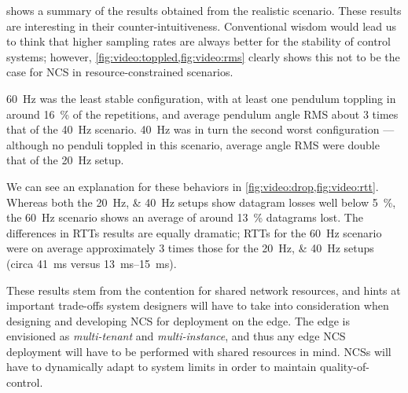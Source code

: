  shows a summary of the results obtained from the realistic scenario.
These results are interesting in their counter-intuitiveness.
Conventional wisdom would lead us to think that higher sampling rates are always better for the stability of control systems; however, \cref{fig:video:toppled,fig:video:rms} clearly shows this not to be the case for \ac{NCS} in resource-constrained scenarios.

\SI{60}{\hertz} was the least stable configuration, with at least one pendulum toppling in around \SI{16}{\percent} of the repetitions, and average pendulum angle \ac{RMS} about \num{3} times that of the \SI{40}{\hertz} scenario.
\SI{40}{\hertz} was in turn the second worst configuration --- although no penduli toppled in this scenario, average angle \ac{RMS} were double that of the \SI{20}{\hertz} setup.

We can see an explanation for these behaviors in \cref{fig:video:drop,fig:video:rtt}.
Whereas both the \SIlist{20;40}{\hertz} setups show datagram losses well below \SI{5}{\percent}, the \SI{60}{\hertz} scenario shows an average of around \SI{13}{\percent} datagrams lost.
The differences in \acp{RTT} results are equally dramatic; \acp{RTT} for the \SI{60}{\hertz} scenario were on average approximately \num{3} times those for the \SIlist{20;40}{\hertz} setups (circa \SI{41}{\milli\second} versus \SIrange[range-phrase=--]{13}{15}{\milli\second}).

These results stem from the contention for shared network resources, and hints at important trade-offs system designers will have to take into consideration when designing and developing \acl{NCS} for deployment on the edge.
The edge is envisioned as \emph{multi-tenant} and \emph{multi-instance}, and thus any edge \ac{NCS} deployment will have to be performed with shared resources in mind.
\acp{NCS} will have to dynamically adapt to system limits in order to maintain quality-of-control.
